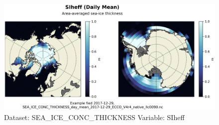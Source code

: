 \begin{figure}[H]
\centering
\includegraphics[scale=0.55]{../images/plots/native_plots/Sea-Ice_and_Snow_Concentration_and_Thickness/SIheff.png}
\caption{Dataset: SEA\_ICE\_CONC\_THICKNESS Variable: SIheff}
\label{tab:table-SEA_ICE_CONC_THICKNESS_SIheff-Plot}
\end{figure}
\pagebreak

